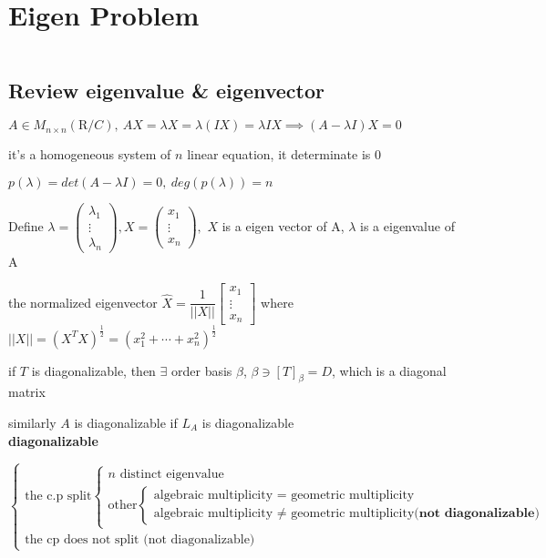 \newpage
\section{Eigen Problem}$ $\\

\subsection{Review  eigenvalue \& eigenvector} $ $\\ 

$A \in M_{n \times n}(\mathrm{R}/C), ~AX = \lambda X = \lambda (IX) = \lambda IX \implies (A - \lambda I)X = 0$

it's a homogeneous system of $n$ linear equation, it determinate is $0$  

$p(\lambda) = det(A - \lambda I) = 0,~ deg(p(\lambda)) = n$

Define $\lambda = \left(\begin{matrix} \lambda_1 \\ \vdots \\ \lambda_n \end{matrix} \right), X = \left(\begin{matrix}x_1\\ \vdots \\ x_n \end{matrix} \right),$ $X$ is a eigen vector of A, $\lambda$ is a eigenvalue of A

the normalized eigenvector $\hat{X} = \dfrac{1}{||X||}\left[\begin{matrix}
	x_1 \\ \vdots \\ x_n \end{matrix} \right]$ where $||X|| = (X^TX)^{\frac{1}{2}}  = (x_1^2+\cdots+x_n^2)^{\frac{1}{2}}$

if $T$ is diagonalizable, then $\exists$ order basis $\beta$, $\beta \ni [T]_{\beta} = D$, which is a diagonal matrix

similarly $A$ is diagonalizable if $L_A$ is diagonalizable \\

\textbf{diagonalizable}

$\begin{cases} \text{the c.p  split} \begin{cases}n \text{ distinct eigenvalue}\\\text{other}\begin{cases}\text{algebraic multiplicity = geometric multiplicity} \\ \text{algebraic multiplicity $\neq$ geometric multiplicity}\textbf{(not diagonalizable)} \end{cases}\end{cases}\\\text{the cp does not split (not diagonalizable)}\end{cases}$

